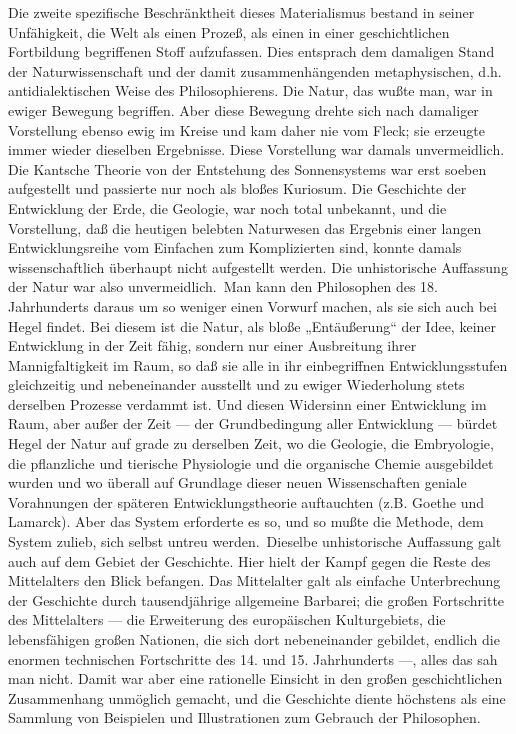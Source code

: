 Die zweite spezifische Beschränktheit dieses Materialismus
bestand in seiner Unfähigkeit, die Welt als einen Prozeß, als einen in
einer geschichtlichen Fortbildung begriffenen Stoff aufzufassen. Dies
entsprach dem damaligen Stand der Naturwissenschaft und der damit
zusammenhängenden metaphysischen, d.h. antidialektischen Weise des
Philosophierens. Die Natur, das wußte man, war in ewiger Bewegung
begriffen. Aber diese Bewegung drehte sich nach damaliger Vorstellung
ebenso ewig im Kreise und kam daher nie vom Fleck; sie erzeugte immer
wieder dieselben Ergebnisse. Diese Vorstellung war damals unvermeidlich.
Die Kantsche Theorie von der Entstehung des Sonnensystems war erst
soeben aufgestellt und passierte nur noch als bloßes Kuriosum. Die
Geschichte der Entwicklung der Erde, die Geologie, war noch total
unbekannt, und die Vorstellung, daß die heutigen belebten Naturwesen das
Ergebnis einer langen Entwicklungsreihe vom Einfachen zum Komplizierten
sind, konnte damals wissenschaftlich überhaupt nicht aufgestellt werden.
Die unhistorische Auffassung der Natur war also unvermeidlich. \textbar{}\,Man
kann den Philosophen des 18. Jahrhunderts daraus um so weniger einen
Vorwurf machen, als sie sich auch bei Hegel findet. Bei diesem ist die
Natur, als bloße „Entäußerung`` der Idee, keiner Entwicklung in der Zeit
fähig, sondern nur einer Ausbreitung ihrer Mannigfaltigkeit im Raum, so
daß sie alle in ihr einbegriffnen Entwicklungsstufen gleichzeitig und
nebeneinander ausstellt und zu ewiger Wiederholung stets derselben
Prozesse verdammt ist. Und diesen Widersinn einer Entwicklung im Raum,
aber außer der Zeit --- der Grundbedingung aller Entwicklung --- bürdet
Hegel der Natur auf grade zu derselben Zeit, wo die Geologie, die
Embryologie, die pflanzliche und tierische Physiologie und die
organische Chemie ausgebildet wurden und wo überall auf Grundlage dieser
neuen Wissenschaften geniale Vorahnungen der späteren
Entwicklungstheorie auftauchten (z.B. Goethe und Lamarck). Aber das
System erforderte es so, und so mußte die Methode, dem System zulieb,
sich selbst untreu werden.\,\textbar{} Dieselbe unhistorische Auffassung galt auch
auf dem Gebiet der Geschichte. Hier hielt der Kampf gegen die Reste des
Mittelalters den Blick befangen. Das Mittelalter galt als einfache
Unterbrechung der Geschichte durch tausendjährige allgemeine Barbarei;
die großen Fortschritte des Mittelalters --- die Erweiterung des
europäischen Kulturgebiets, die lebensfähigen großen Nationen, die sich
dort nebeneinander gebildet, endlich die enormen technischen
Fortschritte des 14. und 15. Jahrhunderts ---, alles das sah man nicht.
Damit war aber eine rationelle Einsicht in den großen geschichtlichen
Zusammenhang unmöglich gemacht, und die Geschichte diente höchstens als
eine Sammlung von Beispielen und Illustrationen zum Gebrauch der
Philosophen.

